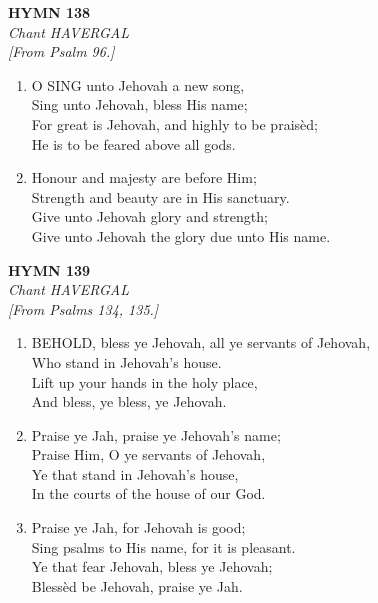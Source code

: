 \newpage
\begin{center}
    {\Large \textbf{HYMN 138}}
    \\
    \textit{Chant HAVERGAL}
    \\
    \textit{\small [From Psalm 96.]}
\end{center}
\vspace{1em}

\begin{enumerate}
    \item O SING unto Jehovah a new song, \\
        Sing unto Jehovah, bless His name; \\
        For great is Jehovah, and highly to be prais\`ed; \\
        He is to be feared above all gods.

    \item Honour and majesty are before Him; \\
        Strength and beauty are in His sanctuary. \\
        Give unto Jehovah glory and strength; \\
        Give unto Jehovah the glory due unto His name.

\end{enumerate}

\newpage
\begin{center}
    {\Large \textbf{HYMN 139}}
    \\
    \textit{Chant HAVERGAL}
    \\
    \textit{\small [From Psalms 134, 135.]}
\end{center}
\vspace{1em}

\begin{enumerate}
    \item BEHOLD, bless ye Jehovah, all ye servants of Jehovah, \\
        Who stand in Jehovah's house. \\
        Lift up your hands in the holy place, \\
        And bless, ye bless, ye Jehovah.

    \item Praise ye Jah, praise ye Jehovah's name; \\
        Praise Him, O ye servants of Jehovah, \\
        Ye that stand in Jehovah's house, \\
        In the courts of the house of our God.

    \item Praise ye Jah, for Jehovah is good; \\
        Sing psalms to His name, for it is pleasant. \\
        Ye that fear Jehovah, bless ye Jehovah; \\
        Bless\`ed be Jehovah, praise ye Jah.

\end{enumerate}

